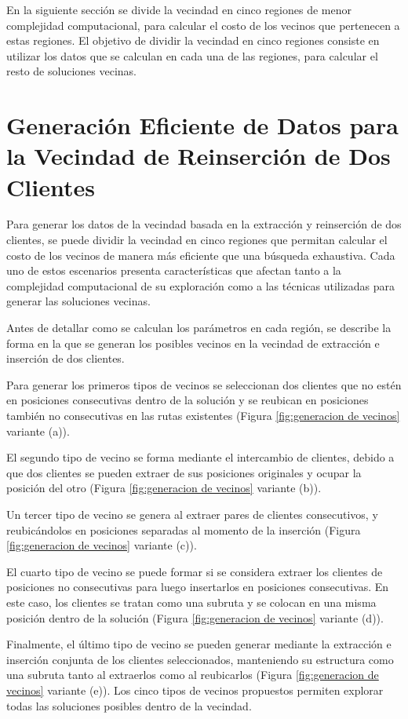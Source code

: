 \documentclass[12pt]{report}
\begin{document}
	En la siguiente sección se divide la vecindad en cinco regiones de menor complejidad computacional, para calcular el costo de los vecinos que pertenecen a estas regiones. El objetivo de dividir la vecindad en cinco regiones consiste en utilizar los datos que se calculan en cada una de las regiones, para calcular el resto de soluciones vecinas.

	\section{Generación Eficiente de Datos para la Vecindad de Reinserción de Dos Clientes}
	\label{sec:Generacion Eficiente}

	Para generar los datos de la vecindad basada en la extracción y reinserción de dos clientes, se puede dividir la vecindad en cinco regiones que permitan calcular el costo de los vecinos de manera más eficiente que una búsqueda exhaustiva. Cada uno de estos escenarios presenta características que afectan tanto a la complejidad computacional de su exploración como a las técnicas utilizadas para generar las soluciones vecinas.

	Antes de detallar como se calculan los parámetros en cada región, se describe la forma en la que se generan los posibles vecinos en la vecindad de extracción e inserción de dos clientes.

	Para generar los primeros tipos de vecinos se seleccionan dos clientes que no estén en posiciones consecutivas dentro de la solución y se reubican en posiciones también no consecutivas en las rutas existentes (Figura \ref{fig:generacion de vecinos} variante (a)).

	El segundo tipo de vecino se forma mediante el intercambio de clientes, debido a que dos clientes se pueden extraer de sus posiciones originales y ocupar la posición del otro (Figura \ref{fig:generacion de vecinos} variante (b)).

	Un tercer tipo de vecino se genera al extraer pares de clientes consecutivos, y reubicándolos en posiciones separadas al momento de la inserción (Figura \ref{fig:generacion de vecinos} variante (c)).

	El cuarto tipo de vecino se puede formar si se considera extraer los clientes de posiciones no consecutivas para luego insertarlos en posiciones consecutivas. En este caso, los clientes se tratan como una subruta y se colocan en una misma posición dentro de la solución (Figura \ref{fig:generacion de vecinos} variante (d)).

    Finalmente, el último tipo de vecino se pueden generar mediante la extracción e inserción conjunta de los clientes seleccionados, manteniendo su estructura como una subruta tanto al extraerlos como al reubicarlos (Figura \ref{fig:generacion de vecinos} variante (e)). Los cinco tipos de vecinos propuestos permiten explorar todas las soluciones posibles dentro de la vecindad.
\end{document}
